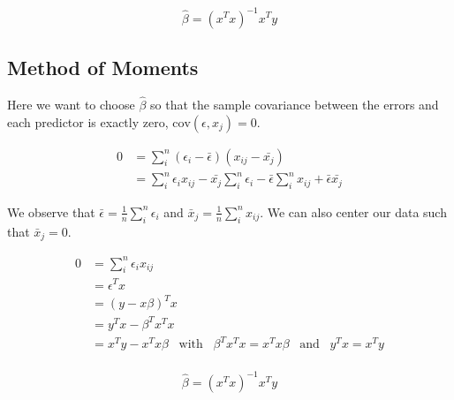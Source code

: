 \documentclass[12pt]{article}
\newcommand{\cov}{\text{cov}}
\begin{document}
        \begin{equation}
            \hat{\beta} = (x^T x)^{-1} x^T y
        \end{equation}

        \subsection*{Method of Moments}

        Here we want to choose $\hat{\beta}$ so that the sample covariance between the errors and each predictor is exactly zero, $\cov(\epsilon, x_j)=0$.  

        \begin{align}
            0 &= \sum_i^n (\epsilon_i - \bar{\epsilon})(x_{ij} - \bar{x_j}) \\
            & = \sum_i^n \epsilon_i x_{ij} - \bar{x_j} \sum_i^n \epsilon_i - \bar{\epsilon} \sum_i^n x_{ij} + \bar{\epsilon} \bar{x_j} 
        \end{align}

        We observe that $\bar{\epsilon} = \frac{1}{n}\sum_i^n \epsilon_i$ and $\bar{x}_j = \frac{1}{n} \sum_i^n x_{ij}$. We can also center our data such that $\bar{x}_j = 0$. 

        \begin{align}
            0 &= \sum_i^n \epsilon_i x_{ij} \\
            & = \epsilon^T x \\
            & = (y - x \beta)^T x \\
            & = y^T x - \beta^T x^T x \\
            & = x^Ty - x^T x \beta \hspace{10pt} \text{with} \hspace{10pt} \beta^T x^T x = x^T x \beta \hspace{10pt} \text{and} \hspace{10pt} y^T x = x^T y\\
        \end{align}

        \begin{equation}
            \hat{\beta} = (x^T x)^{-1} x^T y
        \end{equation}
\end{document}
